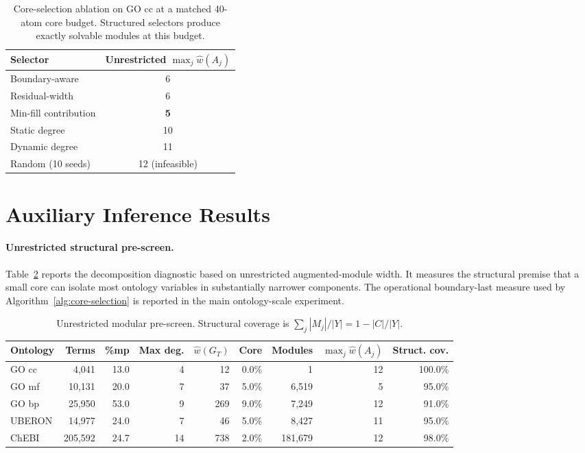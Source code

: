 \documentclass[letterpaper]{article}
\begin{document}
\begin{table}[t]
\centering
\small
\setlength{\tabcolsep}{3pt}
\begin{tabular}{lc}
\toprule
Selector & Unrestricted \(\max_j\widehat w(A_j)\) \\
\midrule
Boundary-aware & 6 \\
Residual-width & 6 \\
Min-fill contribution & \textbf{5} \\
Static degree & 10 \\
Dynamic degree & 11 \\
Random (10 seeds) & 12 (infeasible) \\
\bottomrule
\end{tabular}
\caption{Core-selection ablation on GO cc at a matched 40-atom core
budget. Structured selectors produce exactly solvable modules at this
budget.}
\label{tab:core-ablation}
\end{table}

\section{Auxiliary Inference Results}

\paragraph{Unrestricted structural pre-screen.}
Table~\ref{tab:structure-decomposition} reports the decomposition
diagnostic based on unrestricted augmented-module width. It measures the
structural premise that a small core can isolate most ontology variables
in substantially narrower components. The operational boundary-last
measure used by Algorithm~\ref{alg:core-selection} is reported in
the main ontology-scale experiment.

\begin{table}[t]
\centering
\small
\setlength{\tabcolsep}{5pt}
\begin{tabular}{lrrrrrrrr}
\toprule
Ontology & Terms & \%mp & Max deg. & \(\widehat w(G_T)\)
& Core & Modules & \(\max_j\widehat w(A_j)\) & Struct. cov. \\
\midrule
GO cc  & 4,041   & 13.0 & 4  & 12  & 0.0\% & 1       & 12 & 100.0\% \\
GO mf  & 10,131  & 20.0 & 7  & 37  & 5.0\% & 6,519   & 5  & 95.0\%  \\
GO bp  & 25,950  & 53.0 & 9  & 269 & 9.0\% & 7,249   & 12 & 91.0\%  \\
UBERON & 14,977  & 24.0 & 7  & 46  & 5.0\% & 8,427   & 11 & 95.0\%  \\
ChEBI  & 205,592 & 24.7 & 14 & 738 & 2.0\% & 181,679 & 12 & 98.0\%  \\
\bottomrule
\end{tabular}
\caption{Unrestricted modular pre-screen. Structural coverage is
\(\sum_j|M_j|/|Y|=1-|C|/|Y|\).}
\label{tab:structure-decomposition}
\end{table}
\end{document}
